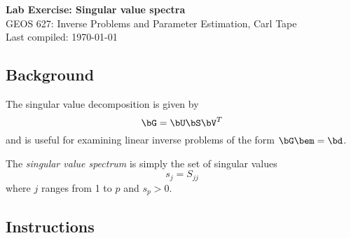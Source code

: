 \documentclass[11pt,titlepage,fleqn]{article}
\begin{document}

\begin{spacing}{1.2}
\centering
{\large \bf Lab Exercise: Singular value spectra} \\
GEOS 627: Inverse Problems and Parameter Estimation, Carl Tape \\
Last compiled: \today
\end{spacing}


\subsection*{Background}

The singular value decomposition is given by
%
\begin{equation*}
\bG = \bU\bS\bV^T
\end{equation*}
%
and is useful for examining linear inverse problems of the form $\bG\bem = \bd$.

The {\em singular value spectrum} is simply the set of singular values
%
\begin{equation*}
s_j = S_{jj}
\end{equation*}
%
where $j$ ranges from 1 to $p$ and $s_p > 0$.


\subsection*{Instructions}
\end{document}
